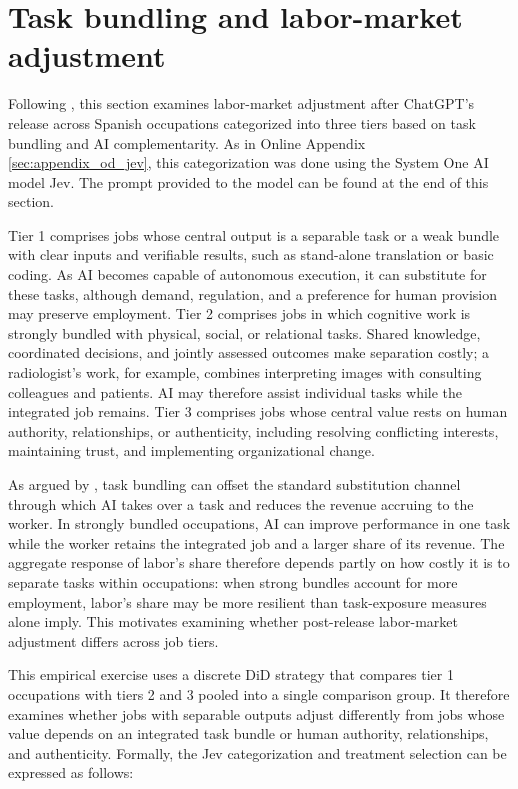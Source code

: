 \clearpage
\section{Task bundling and labor-market adjustment}
\label{sec:v1_job_tiers}
Following \citet{garicano2026messy}, this section examines labor-market adjustment after ChatGPT's release across Spanish occupations categorized into three tiers based on task bundling and AI complementarity. As in Online Appendix \ref{sec:appendix_od_jev}, this categorization was done using the System One AI model Jev. The prompt provided to the model can be found at the end of this section.

Tier 1 comprises jobs whose central output is a separable task or a weak bundle with clear inputs and verifiable results, such as stand-alone translation or basic coding. As AI becomes capable of autonomous execution, it can substitute for these tasks, although demand, regulation, and a preference for human provision may preserve employment. Tier 2 comprises jobs in which cognitive work is strongly bundled with physical, social, or relational tasks. Shared knowledge, coordinated decisions, and jointly assessed outcomes make separation costly; a radiologist's work, for example, combines interpreting images with consulting colleagues and patients. AI may therefore assist individual tasks while the integrated job remains. Tier 3 comprises jobs whose central value rests on human authority, relationships, or authenticity, including resolving conflicting interests, maintaining trust, and implementing organizational change.

As argued by \citet{garicano2026weak}, task bundling can offset the standard substitution channel through which AI takes over a task and reduces the revenue accruing to the worker. In strongly bundled occupations, AI can improve performance in one task while the worker retains the integrated job and a larger share of its revenue. The aggregate response of labor's share therefore depends partly on how costly it is to separate tasks within occupations: when strong bundles account for more employment, labor's share may be more resilient than task-exposure measures alone imply. This motivates examining whether post-release labor-market adjustment differs across job tiers.

This empirical exercise uses a discrete DiD strategy that compares tier 1 occupations with tiers 2 and 3 pooled into a single comparison group. It therefore examines whether jobs with separable outputs adjust differently from jobs whose value depends on an integrated task bundle or human authority, relationships, and authenticity. Formally, the Jev categorization and treatment selection can be expressed as follows:

